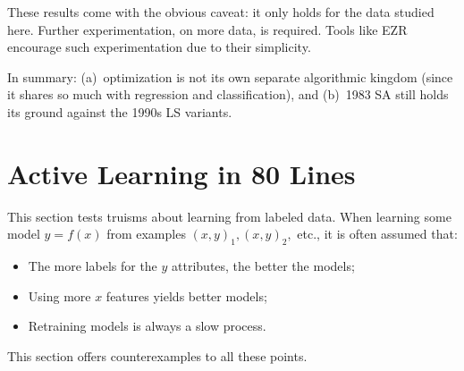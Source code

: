 \documentclass[AMA,STIX2COL]{WileyNJDv5}
\begin{document}
These results come with the obvious caveat: it only holds
for the data studied here. Further experimentation, on more data,
is required.  Tools like EZR encourage such experimentation
due to their simplicity.

In summary: (a)~optimization is not its own
separate algorithmic kingdom (since it shares so much with regression and classification),
and (b)~1983 SA still holds its ground against
the 1990s LS variants.


\section{Active Learning in 80 Lines}\label{sec:active}

This section tests  truisms about learning
from labeled data. 
When learning some model $y=f(x)$ from examples $(x,y)_1, (x,y)_2,$ etc.,
it is often assumed that:
\begin{itemize}
\item
The  more labels for the $y$ attributes, the better the models;
\item 
Using 
more  $x$ features yields better models;
\item
Retraining models is always  a slow process.
\end{itemize}
This section offers counterexamples to all these points.
\end{document}
